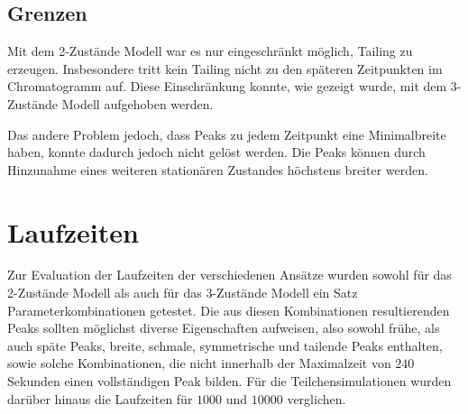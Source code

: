 \subsection{Grenzen}

Mit dem 2-Zustände Modell war es nur eingeschränkt möglich, Tailing zu erzeugen. Insbesondere tritt kein Tailing nicht zu den späteren Zeitpunkten im Chromatogramm auf. Diese Einschränkung konnte, wie gezeigt wurde, mit dem 3-Zustände Modell aufgehoben werden. 

Das andere Problem jedoch, dass Peaks zu jedem Zeitpunkt eine Minimalbreite haben, konnte dadurch jedoch nicht gelöst werden. Die Peaks können durch Hinzunahme eines weiteren stationären Zustandes höchstens breiter werden. 

\section{Laufzeiten}

Zur Evaluation der Laufzeiten der verschiedenen Ansätze wurden sowohl für das 2-Zustände Modell als auch für das 3-Zustände Modell ein Satz Parameterkombinationen getestet. Die aus diesen Kombinationen resultierenden Peaks sollten möglichst diverse Eigenschaften aufweisen, also sowohl frühe, als auch späte Peaks, breite, schmale, symmetrische und tailende Peaks enthalten, sowie solche Kombinationen, die nicht innerhalb der Maximalzeit von $240$ Sekunden einen vollständigen Peak bilden.
Für die Teilchensimulationen wurden darüber hinaus die Laufzeiten für $1000$ und $10000$ verglichen.

 